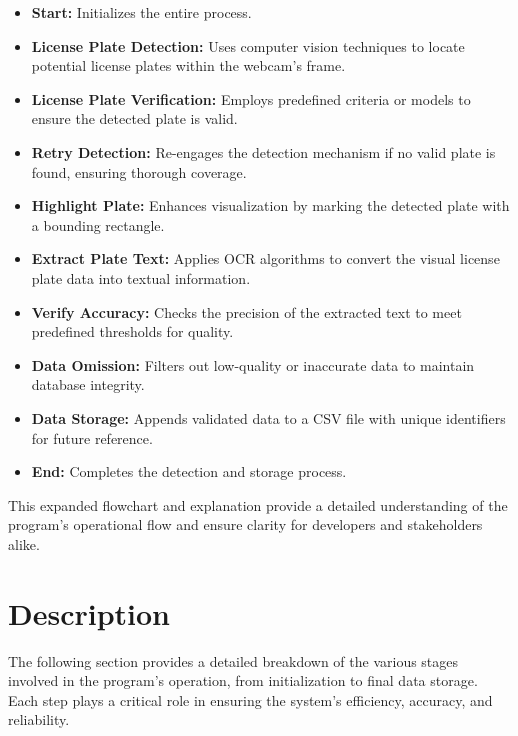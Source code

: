\begin{itemize}
	\item \textbf{Start:} Initializes the entire process.
	\item \textbf{License Plate Detection:} Uses computer vision techniques to locate potential license plates within the webcam's frame.
	\item \textbf{License Plate Verification:} Employs predefined criteria or models to ensure the detected plate is valid.
	\item \textbf{Retry Detection:} Re-engages the detection mechanism if no valid plate is found, ensuring thorough coverage.
	\item \textbf{Highlight Plate:} Enhances visualization by marking the detected plate with a bounding rectangle.
	\item \textbf{Extract Plate Text:} Applies OCR algorithms to convert the visual license plate data into textual information.
	\item \textbf{Verify Accuracy:} Checks the precision of the extracted text to meet predefined thresholds for quality.
	\item \textbf{Data Omission:} Filters out low-quality or inaccurate data to maintain database integrity.
	\item \textbf{Data Storage:} Appends validated data to a CSV file with unique identifiers for future reference.
	\item \textbf{End:} Completes the detection and storage process.
\end{itemize}

This expanded flowchart and explanation provide a detailed understanding of the program's operational flow and ensure clarity for developers and stakeholders alike.

\section{Description}

The following section provides a detailed breakdown of the various stages involved in the program's operation, from initialization to final data storage. Each step plays a critical role in ensuring the system's efficiency, accuracy, and reliability.

